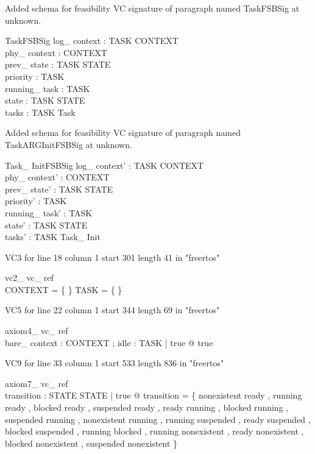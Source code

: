 \documentclass{article}
\begin{document}
Added schema for feasibility VC signature of paragraph named TaskFSBSig at unknown.
\begin{schema}{TaskFSBSig}
log\_ context : TASK \fun CONTEXT \\
 phy\_ context : CONTEXT \\
 prev\_ state : TASK \fun STATE \\
 priority : TASK \fun \nat \\
 running\_ task : TASK \\
 state : TASK \fun STATE \\
 tasks : \power TASK 
\where
 Task
\end{schema}


Added schema for feasibility VC signature of paragraph named TaskARGInitFSBSig at unknown.
\begin{schema}{Task\_ InitFSBSig}
log\_ context' : TASK \fun CONTEXT \\
 phy\_ context' : CONTEXT \\
 prev\_ state' : TASK \fun STATE \\
 priority' : TASK \fun \nat \\
 running\_ task' : TASK \\
 state' : TASK \fun STATE \\
 tasks' : \power TASK 
\where
 Task\_ Init
\end{schema}

VC3 for line 18 column 1 start 301 length 41 in "freertos"
\begin{theorem}{ vc2\_ vc\_ ref}\\
 \lnot CONTEXT = \{ \} \land \lnot TASK = \{ \} \\

\end{theorem}

VC5 for line 22 column 1 start 344 length 69 in "freertos"
\begin{theorem}{ axiom4\_ vc\_ ref}\\
 \exists bare\_ context : CONTEXT ; idle : TASK | true @ true \\

\end{theorem}

VC9 for line 33 column 1 start 533 length 836 in "freertos"
\begin{theorem}{ axiom7\_ vc\_ ref}\\
 \exists transition : STATE \rel STATE | true @ transition = \{ nonexistent \mapsto ready , running \mapsto ready , blocked \mapsto ready , suspended \mapsto ready , ready \mapsto running , blocked \mapsto running , suspended \mapsto running , nonexistent \mapsto running , running \mapsto suspended , ready \mapsto suspended , blocked \mapsto suspended , running \mapsto blocked , running \mapsto nonexistent , ready \mapsto nonexistent , blocked \mapsto nonexistent , suspended \mapsto nonexistent \} \\

\end{theorem}
\end{document}
